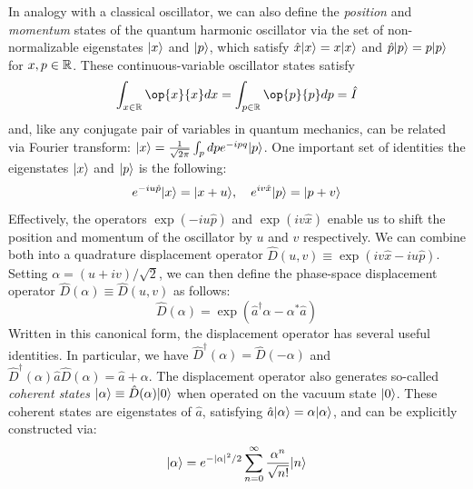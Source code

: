 In analogy with a classical oscillator, we can also define the \textit{position} and \textit{momentum} states of the quantum harmonic oscillator via the set of non-normalizable eigenstates $\lvert x\rangle$ and $\lvert p\rangle$, which satisfy $\hat{x}\lvert x\rangle = x\lvert x\rangle$ and $\hat{p}\lvert p\rangle = p\lvert p\rangle$ for $x, p \in \mathbb{R}$. These continuous-variable oscillator states satisfy
\begin{equation}
    \int_{x \in \R} \op{x}{x}dx = \int_{p \in \R} \op{p}{p} dp = \hat{I}
\end{equation}
and, like any conjugate pair of variables in quantum mechanics, can be related via Fourier transform: $\lvert x\rangle = \frac{1}{\sqrt{2\pi}} \int_p dp e^{-ipq}\lvert p\rangle$. One important set of identities the eigenstates $\lvert x\rangle$ and $\lvert p\rangle$ is the following: 
\begin{equation}
    e^{-iu\hat{p}}\lvert x\rangle = \lvert x + u\rangle, \quad e^{iv\hat{x}}\lvert p\rangle = \lvert p+v\rangle
\end{equation}
Effectively, the operators $\exp(-iu\hat{p})$ and $\exp(iv\hat{x})$ enable us to shift the position and momentum of the oscillator by $u$ and $v$ respectively. We can combine both into a quadrature displacement operator $\hat{D}(u, v) \equiv \exp(iv\hat{x} - iu\hat{p})$. Setting $\alpha = (u+iv)/\sqrt{2}$, we can then define the phase-space displacement operator $\hat{D}(\alpha) \equiv \hat{D}(u, v)$ as follows: 
\begin{equation}
    \hat{D}(\alpha) = \exp(\hat{a}^\dagger \alpha - \alpha^\ast \hat{a})
\end{equation}
Written in this canonical form, the displacement operator has several useful identities. In particular,  we have $\hat{D}^\dagger(\alpha) = \hat{D}(-\alpha)$ and $\hat{D}^\dagger(\alpha) \hat{a} \hat{D}(\alpha) = \hat{a} + \alpha$. The displacement operator also generates so-called \textit{coherent states} $\lvert\alpha\rangle \equiv \hat{D}(\alpha)\lvert0\rangle$ when operated on the vacuum state $\lvert0\rangle$. These coherent states are eigenstates of $\hat{a}$, satisfying $\hat{a}\lvert\alpha\rangle = \alpha\lvert\alpha\rangle$, and can be explicitly constructed via:
\begin{equation}
    \lvert\alpha\rangle = e^{-|\alpha|^2/2}\sum_{n=0}^\infty \frac{\alpha^n}{\sqrt{n!}} \lvert n\rangle
\end{equation}

